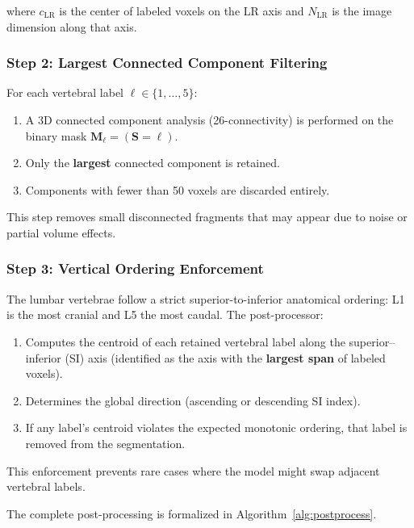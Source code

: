 \documentclass[12pt, a4paper]{article}
\begin{document}
where $c_{\text{LR}}$ is the center of labeled voxels on the LR axis and $N_{\text{LR}}$ is the image dimension along that axis.

\subsubsection{Step 2: Largest Connected Component Filtering}

For each vertebral label $\ell \in \{1, \ldots, 5\}$:
\begin{enumerate}[noitemsep]
    \item A 3D connected component analysis (26-connectivity) is performed on the binary mask $\mathbf{M}_\ell = (\mathbf{S} = \ell)$.
    \item Only the \textbf{largest} connected component is retained.
    \item Components with fewer than 50 voxels are discarded entirely.
\end{enumerate}

This step removes small disconnected fragments that may appear due to noise or partial volume effects.

\subsubsection{Step 3: Vertical Ordering Enforcement}

The lumbar vertebrae follow a strict superior-to-inferior anatomical ordering: L1 is the most cranial and L5 the most caudal. The post-processor:
\begin{enumerate}[noitemsep]
    \item Computes the centroid of each retained vertebral label along the superior--inferior (SI) axis (identified as the axis with the \textbf{largest span} of labeled voxels).
    \item Determines the global direction (ascending or descending SI index).
    \item If any label's centroid violates the expected monotonic ordering, that label is removed from the segmentation.
\end{enumerate}

This enforcement prevents rare cases where the model might swap adjacent vertebral labels.

The complete post-processing is formalized in Algorithm~\ref{alg:postprocess}.
\end{document}
